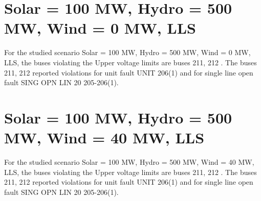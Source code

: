 \documentclass[10pt]{report}
\begin{document}
\section{Solar = 100 MW, Hydro = 500 MW, Wind = 0 MW, LLS}

For the studied scenario Solar = 100 MW, Hydro = 500 MW, Wind = 0 MW, LLS, the buses violating the Upper voltage limits are buses 211, 212 .
The buses 211, 212 reported violations for unit fault UNIT 206(1) and for single line open fault SING OPN LIN   20 205-206(1).
\begin{table}[H]
\caption{Contingencies reporting bus voltages greater than emergency voltage of 1.1 PU for scenario Solar = 100 MW, Hydro = 500 MW, Wind = 0 MW, LLS}
\label{HVSolar100MWHydro500MWWind0MWLLS}
\centering
{}
\end{table}

\section{Solar = 100 MW, Hydro = 500 MW, Wind = 40 MW, LLS}

For the studied scenario Solar = 100 MW, Hydro = 500 MW, Wind = 40 MW, LLS, the buses violating the Upper voltage limits are buses 211, 212 .
The buses 211, 212 reported violations for unit fault UNIT 206(1) and for single line open fault SING OPN LIN   20 205-206(1).
\begin{table}[H]
\caption{Contingencies reporting bus voltages greater than emergency voltage of 1.1 PU for scenario Solar = 100 MW, Hydro = 500 MW, Wind = 40 MW, LLS}
\label{HVSolar100MWHydro500MWWind40MWLLS}
\centering
{}
\end{table}
\end{document}
